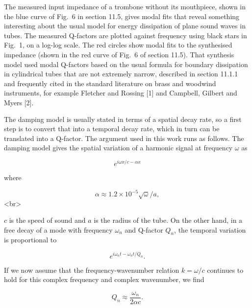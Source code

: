   The measured input impedance of a trombone without its mouthpiece, shown in 
  the blue curve of Fig.\ 6 in section 11.5, gives modal fits that reveal 
  something interesting about the usual model for energy dissipation of plane 
  sound waves in tubes. The measured Q-factors are plotted against frequency 
  using black stars in Fig.\ 1, on a log-log scale. The red circles show modal 
  fits to the synthesised impedance (shown in the red curve of Fig.\ 6 of 
  section 11.5). That synthesis model used modal Q-factors based on the usual 
  formula for boundary dissipation in cylindrical tubes that are not extremely 
  narrow, described in section 11.1.1 and frequently cited in the standard 
  literature on brass and woodwind instruments, for example Fletcher and 
  Rossing [1] and Campbell, Gilbert and Myers [2]. 


  The damping model is usually stated in terms of a spatial decay rate, so a 
  first step is to convert that into a temporal decay rate, which in turn can 
  be translated into a Q-factor. The argument used in this work runs as 
  follows. The damping model gives the spatial variation of a harmonic signal 
  at frequency $\omega$ as 

  $$e^{i\omega x/c-\alpha x} \tag{1}$$ 

  where 

  $$\alpha \approx 1.2 \times 10^{-5} \sqrt{\omega}/a, \tag{2}$$<br> 

  $c$ is the speed of sound and $a$ is the radius of the tube. On the other 
  hand, in a free decay of a mode with frequency $\omega_n$ and Q-factor $Q_n$, 
  the temporal variation is proportional to 

  $$e^{i \omega_n t -\omega_n t/Q_n} . \tag{3}$$ 

  If we now assume that the frequency-wavenumber relation $k=\omega/c$ 
  continues to hold for this complex frequency and complex wavenumber, we find 

  $$Q_n \approx \frac{\omega_n}{2 \alpha c} . \tag{4}$$ 

